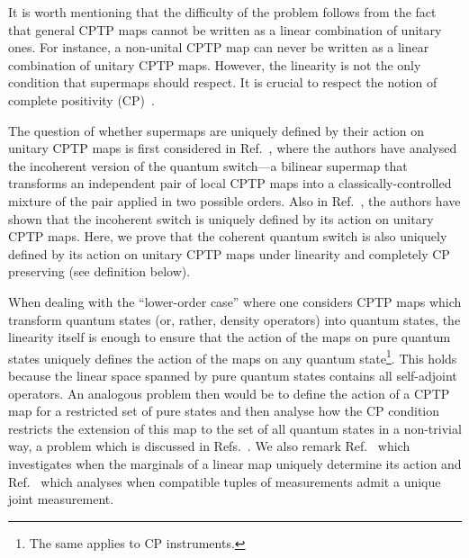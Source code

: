 \documentclass[a4paper,twocolumn,accepted=2022-10-23]{quantumarticle}
\theoremstyle{definition}
\begin{document}
It is worth mentioning that the difficulty of the problem follows from the fact that general CPTP maps cannot be written as a linear combination of unitary ones. For instance, a non-unital CPTP map can never be written as a linear combination of unitary CPTP maps. However, the linearity is not the only condition that supermaps should respect. It is crucial to respect the notion of complete positivity (CP)~\cite{comb1,comb2,comb3,qs_comm1,indefinite_correlation,indefinite_purification}.

The question of whether supermaps are uniquely defined by their action on unitary CPTP maps is first considered in Ref.~\cite{qswitch}, where the authors have analysed the incoherent version of the quantum switch---a bilinear supermap that transforms an independent pair of local CPTP maps into a classically-controlled mixture of the pair applied in two possible orders.
Also in Ref.~\cite{qswitch}, the authors have shown that the incoherent switch is uniquely defined by its action on unitary CPTP maps. Here, we prove that the coherent quantum switch is also uniquely defined by its action on unitary CPTP maps under linearity and completely CP preserving (see definition below).


When dealing with the ``lower-order case'' where one considers CPTP maps which transform quantum states (or, rather, density operators) into quantum states, the linearity itself is enough to ensure that the action of the maps on pure quantum states uniquely defines the action of the maps on any quantum state\footnote{The same applies to CP instruments.}. This holds because the linear space spanned by pure quantum states contains all self-adjoint operators.
An analogous problem then would be to define the action of a CPTP map for a restricted set of pure states and then analyse how the CP condition restricts the extension of this map to the set of all quantum states in a non-trivial way, a problem which is discussed in Refs.~\cite{chefles00,chefles03,extending,ncopy}. We also remark Ref.~\cite{haapasalo14} which investigates when the marginals of a linear map uniquely determine its action and Ref.~\cite{guerini18} which analyses when compatible tuples of measurements admit a unique joint measurement.
\end{document}
